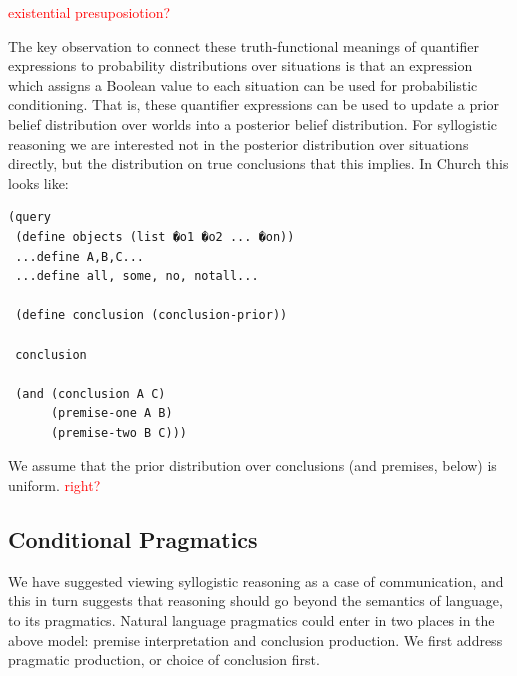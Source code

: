 \documentclass[10pt,letterpaper]{article}
\newcommand{\red}[1]{\textcolor{Red}{#1}}
\begin{document}
\red{existential presuposiotion?}

The key observation to connect these truth-functional meanings of quantifier expressions to probability distributions over situations is that an expression which assigns a Boolean value to each situation can be used for probabilistic conditioning. That is, these quantifier expressions can be used to update a prior belief distribution over worlds into a posterior belief distribution. For syllogistic reasoning we are interested not in the posterior distribution over situations directly, but the distribution on true conclusions that this implies. In Church this looks like:
\begin{lstlisting}
(query
 (define objects (list �o1 �o2 ... �on)) 
 ...define A,B,C...
 ...define all, some, no, notall...
 
 (define conclusion (conclusion-prior))
 
 conclusion
 
 (and (conclusion A C) 
      (premise-one A B)
      (premise-two B C)))
\end{lstlisting}
We assume that the prior distribution over conclusions (and premises, below) is uniform. \red{right?}

%
%  
%  


\subsection{Conditional Pragmatics}
We have suggested viewing syllogistic reasoning as a case of communication, and this in turn suggests that reasoning should go beyond the semantics of language, to its pragmatics.
Natural language pragmatics could enter in two places in the above model: premise interpretation and conclusion production. 
We first address pragmatic production, or choice of conclusion first.
\end{document}
